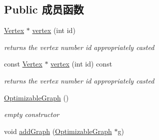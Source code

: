 \subsection*{Public 成员函数}
\begin{DoxyCompactItemize}
\item 
\hypertarget{structg2o_1_1OptimizableGraph_a19e014e8ec2e9a6e894da8c3a8f8e50d}{\hyperlink{classg2o_1_1OptimizableGraph_1_1Vertex}{Vertex} $\ast$ \hyperlink{structg2o_1_1OptimizableGraph_a19e014e8ec2e9a6e894da8c3a8f8e50d}{vertex} (int id)}\label{structg2o_1_1OptimizableGraph_a19e014e8ec2e9a6e894da8c3a8f8e50d}

\begin{DoxyCompactList}\small\item\em returns the vertex number {\itshape id} appropriately casted \end{DoxyCompactList}\item 
\hypertarget{structg2o_1_1OptimizableGraph_a50323fa9906f5018a2be3affc61fc0d7}{const \hyperlink{classg2o_1_1OptimizableGraph_1_1Vertex}{Vertex} $\ast$ \hyperlink{structg2o_1_1OptimizableGraph_a50323fa9906f5018a2be3affc61fc0d7}{vertex} (int id) const }\label{structg2o_1_1OptimizableGraph_a50323fa9906f5018a2be3affc61fc0d7}

\begin{DoxyCompactList}\small\item\em returns the vertex number {\itshape id} appropriately casted \end{DoxyCompactList}\item 
\hypertarget{structg2o_1_1OptimizableGraph_acc459c08fd5e743cf2072e740ffc5025}{\hyperlink{structg2o_1_1OptimizableGraph_acc459c08fd5e743cf2072e740ffc5025}{Optimizable\-Graph} ()}\label{structg2o_1_1OptimizableGraph_acc459c08fd5e743cf2072e740ffc5025}

\begin{DoxyCompactList}\small\item\em empty constructor \end{DoxyCompactList}\item 
\hypertarget{structg2o_1_1OptimizableGraph_acea1342d9ab0bf717710c8f78b74ff25}{void \hyperlink{structg2o_1_1OptimizableGraph_acea1342d9ab0bf717710c8f78b74ff25}{add\-Graph} (\hyperlink{structg2o_1_1OptimizableGraph}{Optimizable\-Graph} $\ast$g)}\label{structg2o_1_1OptimizableGraph_acea1342d9ab0bf717710c8f78b74ff25}


\end{DoxyCompactItemize}
